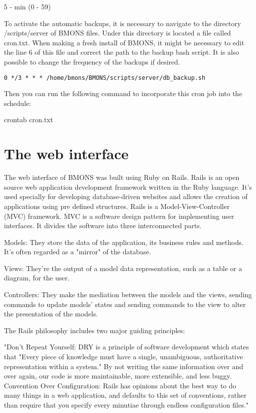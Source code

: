 5 - min (0 - 59)



To activate the automatic backups, it is necessary to navigate to the directory /scripts/server of BMONS files. Under this directory is located a file called cron.txt. When making a fresh install of BMONS, it might be necessary to edit the line 6 of this file and correct the path to the backup bash script. It is also possible to change the frequency of the backups if desired. 



 
\indent\indent \texttt{0 */3 * * * /home/bmons/BMONS/scripts/server/db\_backup.sh}




Then you can run the following command to incorporate this cron job into the schedule:



\indent crontab cron.txt



\clearpage
\section{The web interface}

The web interface of BMONS was built using Ruby on Rails. Rails is an open source web application development framework written in the Ruby language. It's used specially for developing database-driven websites and allows the creation of applications using pre defined structures. Rails is a Model-View-Controller (MVC) framework. MVC is a software design pattern for implementing user interfaces. It divides the software into three interconnected parts. 

Models: They store the data of the application, its business rules and methods. It's often regarded as a "mirror" of the database.

Views: They're the output of a model data representation, such as a table or a diagram, for the user.

Controllers: They make the mediation between the models and the views, sending commands to update models' states and sending commands to the view to alter the presentation of the models.



The Rails philosophy includes two major guiding principles:


"Don't Repeat Yourself: DRY is a principle of software development which states that "Every piece of knowledge must have a single, unambiguous, authoritative representation within a system." By not writing the same information over and over again, our code is more maintainable, more extensible, and less buggy.
Convention Over Configuration: Rails has opinions about the best way to do many things in a web application, and defaults to this set of conventions, rather than require that you specify every minutiae through endless configuration files."


